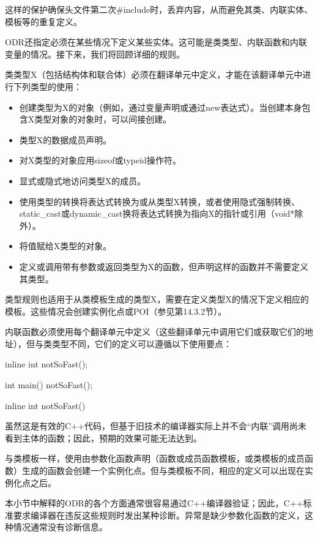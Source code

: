 这样的保护确保头文件第二次\#include时，丢弃内容，从而避免其类、内联实体、模板等的重复定义。

ODR还指定必须在某些情况下定义某些实体。这可能是类类型、内联函数和内联变量的情况。接下来，我们将回顾详细的规则。

类类型X（包括结构体和联合体）必须在翻译单元中定义，才能在该翻译单元中进行下列类型的使用：

\begin{itemize}
\item 
创建类型为X的对象（例如，通过变量声明或通过new表达式）。当创建本身包含X类型对象的对象时，可以间接创建。

\item 
类型X的数据成员声明。

\item 
对X类型的对象应用sizeof或typeid操作符。

\item 
显式或隐式地访问类型X的成员。

\item 
使用类型的转换将表达式转换为或从类型X转换，或者使用隐式强制转换、static\_cast或dynamic\_cast换将表达式转换为指向X的指针或引用（void*除外）。

\item 
将值赋给X类型的对象。

\item 
定义或调用带有参数或返回类型为X的函数，但声明这样的函数并不需要定义其类型。
\end{itemize}

类型规则也适用于从类模板生成的类型X，需要在定义类型X的情况下定义相应的模板。这些情况会创建实例化点或POI（参见第14.3.2节）。

内联函数必须使用每个翻译单元中定义（这些翻译单元中调用它们或获取它们的地址），但与类类型不同，它们的定义可以遵循以下使用要点：

\begin{cpp}
inline int notSoFast();

int main()
{
	notSoFast();
}

inline int notSoFast()
{ }
\end{cpp}

虽然这是有效的C++代码，但基于旧技术的编译器实际上并不会“内联”调用尚未看到主体的函数；因此，预期的效果可能无法达到。

与类模板一样，使用由参数化函数声明（函数或成员函数模板，或类模板的成员函数）生成的函数会创建一个实例化点。但与类模板不同，相应的定义可以出现在实例化点之后。

本小节中解释的ODR的各个方面通常很容易通过C++编译器验证；因此，C++标准要求编译器在违反这些规则时发出某种诊断。异常是缺少参数化函数的定义，这种情况通常没有诊断信息。

